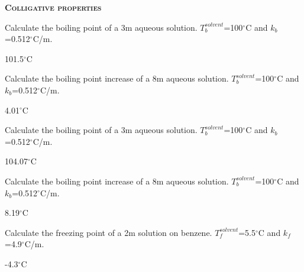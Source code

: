 \documentclass[main.tex]{subfiles}
\begin{document}
\begin{multicols*}{2}
{\raggedright\textsc{\textbf{Colligative properties }}\par}

\begin{question}[ID=\the\value{numA}]
Calculate the boiling point of a 3m  aqueous solution. $T^{solvent}_b$=100$^{\circ}$C and $k_b$=0.512$^{\circ}$C/m.
\end{question}
\begin{solution}
101.5$^{\circ}$C
\hspace{0.1cm}\end{solution}%

\begin{question}[ID=\the\value{numA}]
Calculate the boiling point increase of a 8m  aqueous solution. $T^{solvent}_b$=100$^{\circ}$C and $k_b$=0.512$^{\circ}$C/m.
\end{question}
\begin{solution}
4.01$^{\circ}$C
\hspace{0.1cm}\end{solution}%

\begin{question}[ID=\the\value{numA}]
Calculate the boiling point of a 3m  aqueous solution. $T^{solvent}_b$=100$^{\circ}$C and $k_b$=0.512$^{\circ}$C/m.
\end{question}
\begin{solution}
104.07$^{\circ}$C
\hspace{0.1cm}\end{solution}%

\begin{question}[ID=\the\value{numA}]
Calculate the boiling point increase of a 8m  aqueous solution. $T^{solvent}_b$=100$^{\circ}$C and $k_b$=0.512$^{\circ}$C/m.
\end{question}
\begin{solution}
8.19$^{\circ}$C
\hspace{0.1cm}\end{solution}%


\begin{question}[ID=\the\value{numA}]
Calculate the freezing point of a 2m  solution on benzene. $T^{solvent}_f$=5.5$^{\circ}$C and $k_f$=4.9$^{\circ}$C/m.
\end{question}
\begin{solution}
-4.3$^{\circ}$C
\hspace{0.1cm}\end{solution}%



\end{multicols*}
\end{document}
